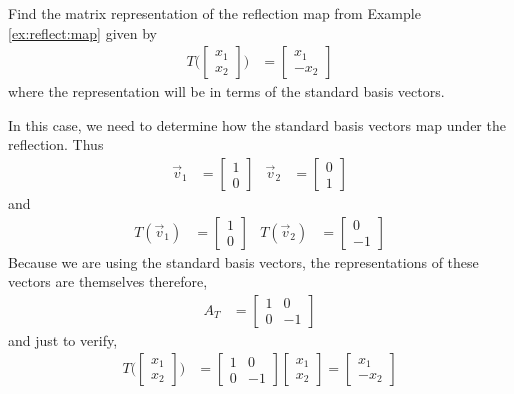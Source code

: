 \begin{example}
Find the matrix representation of the reflection map from Example \ref{ex:reflect:map} given by 
%
\begin{align*}
T\biggl(\begin{bmatrix}
x_1 \\ x_2 
\end{bmatrix} \biggr) & = \begin{bmatrix}
x_1 \\ -x_2 
\end{bmatrix}
\end{align*}
where the representation will be in terms of the standard basis vectors. 

\solution 

In this case, we need to determine how the standard basis vectors map under the reflection.  Thus
%
\begin{align*}
\vec{v}_1 & = \begin{bmatrix}
1 \\ 0 
\end{bmatrix} & \vec{v}_2 & = \begin{bmatrix}
0 \\ 1
\end{bmatrix}
\end{align*}
and 
%
\begin{align*}
T(\vec{v}_1) & = \begin{bmatrix}
1 \\ 0 
\end{bmatrix} & T(\vec{v}_2) & = \begin{bmatrix}
0 \\ -1 
\end{bmatrix}
\end{align*}
Because we are using the standard basis vectors, the representations of these vectors are themselves therefore, 
%
\begin{align*}
A_T & = \begin{bmatrix}
1 & 0 \\
0 & -1 
\end{bmatrix}
\end{align*}
and just to verify, 
%
\begin{align*}
T\biggl(\begin{bmatrix}
x_1 \\ x_2 
\end{bmatrix} \biggr) & = \begin{bmatrix}
1 & 0 \\
0 & -1 
\end{bmatrix} \begin{bmatrix}
x_1 \\ x_2 
\end{bmatrix} = \begin{bmatrix}
x_1 \\ - x_2 
\end{bmatrix}
\end{align*}

\end{example}


